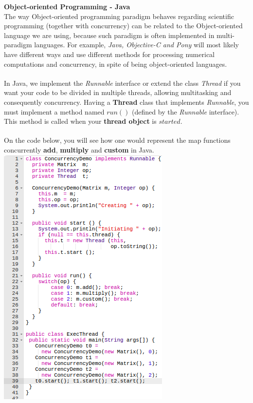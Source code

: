 \documentclass[conference]{IEEEtran}
\begin{document}
\textbf{ Object-oriented Programming - Java }\\
The way Object-oriented programming paradigm behaves regarding scientific programming (together with concurrency) can be related to the Object-oriented language we are using, because such paradigm is often implemented in multi-paradigm languages. For example, \textit{Java, Objective-C and Pony} will most likely have different ways and use different methods for processing numerical computations and concurrency, in spite of being object-oriented languages.
\\\\
In Java, we implement the \textit{Runnable} interface or extend the class \textit{Thread} if you want your code to be divided in multiple threads, allowing multitasking and consequently concurrency. Having a \textbf{Thread} class that implements \textit{Runnable}, you must implement a method named $run()$ (defined by the \textit{Runnable} interface). This method is called when your \textbf{thread object} is $started$.
\\\\
On the code below, you will see how one would represent the map functions concurrently \textbf{add}, \textbf{multiply} and \textbf{custom} in Java.
\\
\includegraphics[scale=0.6]{java_code_5}
\end{document}
